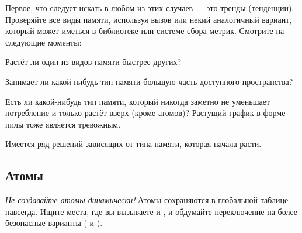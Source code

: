 Первое, что следует искать в любом из этих случаев --- это тренды (тенденции). Проверяйте все виды памяти, используя вызов  или некий аналогичный вариант, который может иметься в библиотеке или системе сбора метрик. Смотрите на следующие моменты:

\begin{itemize*}
	\item Растёт ли один из видов памяти быстрее других?
	\item Занимает ли какой-нибудь тип памяти большую часть доступного пространства?
	\item Есть ли какой-нибудь тип памяти, который никогда заметно не уменьшает потребление и только растёт вверх (кроме атомов)? Растущий график в форме пилы тоже является тревожным.
\end{itemize*}

Имеется ряд решений зависящих от типа памяти, которая начала расти.

\subsection{Атомы}

\emph{Не создавайте атомы динамически!} Атомы сохраняются в глобальной таблице навсегда. Ищите места, где вы вызываете  и , и обдумайте переключение на более безопасные варианты ( и ). 

